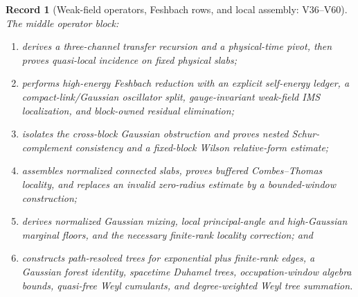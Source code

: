 \documentclass[11pt,oneside]{book}
\newtheorem{record}[theorem]{Record}
\theoremstyle{definition}
\theoremstyle{remark}
\begin{document}
\begin{record}[Weak-field operators, Feshbach rows, and local
assembly: V36--V60]
\label{rec:e8v1-v36-v60}
The middle operator block:
\begin{enumerate}[label=\textup{(\roman*)},leftmargin=3.5em]
\item derives a three-channel transfer recursion and a physical-time
      pivot, then proves quasi-local incidence on fixed physical slabs;
\item performs high-energy Feshbach reduction with an explicit
      self-energy ledger, a compact-link/Gaussian oscillator split,
      gauge-invariant weak-field IMS localization, and block-owned
      residual elimination;
\item isolates the cross-block Gaussian obstruction and proves nested
      Schur-complement consistency and a fixed-block Wilson
      relative-form estimate;
\item assembles normalized connected slabs, proves buffered
      Combes--Thomas locality, and replaces an invalid zero-radius
      estimate by a bounded-window construction;
\item derives normalized Gaussian mixing, local principal-angle and
      high-Gaussian marginal floors, and the necessary finite-rank
      locality correction; and
\item constructs path-resolved trees for exponential plus finite-rank
      edges, a Gaussian forest identity, spacetime Duhamel trees,
      occupation-window algebra bounds, quasi-free Weyl cumulants, and
      degree-weighted Weyl tree summation.
\end{enumerate}
\end{record}
\end{document}
